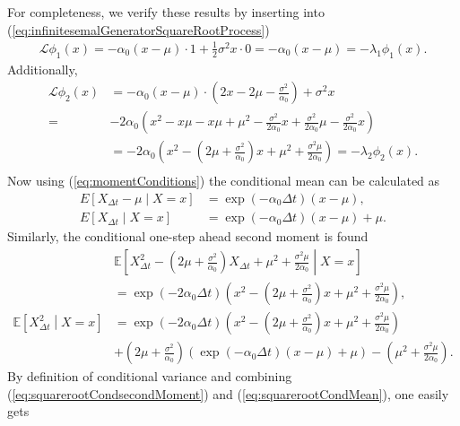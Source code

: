 For completeness, we verify these results by inserting into (\ref{eq:infinitesemalGeneratorSquareRootProcess})
\begin{align}
    \mathcal{L}\phi_1(x) = -\alpha_0\left(x - \mu\right)\cdot 1 + \frac{1}{2}\sigma^2 x \cdot 0 = -\alpha_0\left(x - \mu\right) = -\lambda_1\phi_1(x). \label{eq:directVerificationCondMean}
\end{align}
Additionally,
\begin{align}
    \mathcal{L}\phi_2(x) &= -\alpha_0\left(x - \mu\right)\cdot \left(2x -2\mu - \frac{\sigma^2}{\alpha_0}\right) + \sigma^2x\\
    =& -2\alpha_0\left(x^2-x\mu - x\mu + \mu^2 -\frac{\sigma^2}{2\alpha_0}x + \frac{\sigma^2}{2\alpha_0}\mu - \frac{\sigma^2}{2\alpha_0}x \right)\\
    &= -2\alpha_0 \left(x^2 -\left(2\mu+\frac{\sigma^2}{\alpha_0}\right)x + \mu^2 + \frac{\sigma^2\mu}{2\alpha_0}\right) = -\lambda_2\phi_2(x).\\
\end{align}
Now using (\ref{eq:momentConditions}) the conditional mean can be calculated as
\begin{align}
    E\left[X_{\Delta t} - \mu \middle| X = x\right] &= \exp\left(-\alpha_0\Delta t\right)\left(x-\mu\right),\\
    E\left[X_{\Delta t} \middle| X = x\right] &= \exp\left(-\alpha_0\Delta t\right)\left(x-\mu\right) + \mu. \label{eq:squarerootCondMean}
\end{align}
Similarly, the conditional one-step ahead second moment is found
\begin{align}
    &\mathbb{E}\left[X_{\Delta t}^2 - \left(2\mu + \frac{\sigma^2}{\alpha_0}\right)X_{\Delta t} + \mu^2 + \frac{\sigma^2\mu}{2\alpha_0} \middle| X = x \right] \nonumber \\
    &= \exp\left(-2\alpha_0 \Delta t\right)\left(x^2 - \left(2\mu + \frac{\sigma^2}{\alpha_0}\right)x + \mu^2 + \frac{\sigma^2 \mu}{2\alpha_0}\right),\\
    \mathbb{E}\left[X_{\Delta t}^2 \middle| X = x\right] &= \exp\left(-2\alpha_0 \Delta t\right)\left(x^2 - \left(2\mu + \frac{\sigma^2}{\alpha_0}\right)x + \mu^2 + \frac{\sigma^2 \mu}{2\alpha_0}\right)  \nonumber  \\
     &+ \left(2\mu + \frac{\sigma^2}{\alpha_0}\right) \left(\exp\left(-\alpha_0\Delta t \right)\left(x-\mu\right) + \mu\right) - \left(\mu^2 + \frac{\sigma^2\mu}{2\alpha_0}\right). \label{eq:squarerootCondsecondMoment}
\end{align}
By definition of conditional variance and combining (\ref{eq:squarerootCondsecondMoment}) and (\ref{eq:squarerootCondMean}), one easily gets
